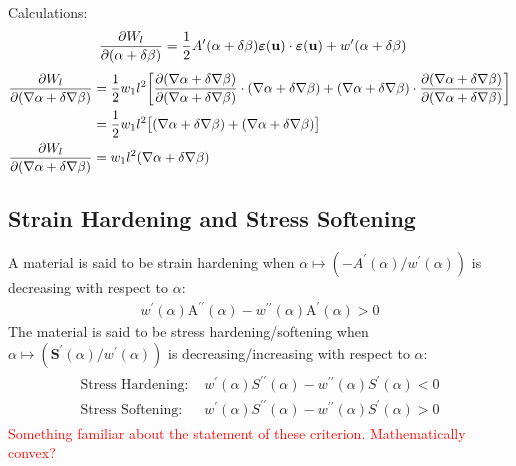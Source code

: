 \documentclass[12pt,3p]{article}
\numberwithin{equation}{section}
\begin{document}
Calculations: 
\begin{align*}
\pdv{W_l}{(\alpha + \delta \beta)} &= \frac{1}{2} A'(\alpha + \delta \beta) \boldsymbol{\varepsilon} (\mathbf{u}) \cdot \boldsymbol{\varepsilon} (\mathbf{u}) + w'(\alpha + \delta \beta)
\end{align*}
\begin{align*}
\pdv{W_l}{(\nabla \alpha + \delta \nabla \beta)} &= \frac{1}{2} w_1 l^2 \bigg[ \pdv{(\nabla \alpha + \delta \nabla \beta)}{(\nabla \alpha + \delta \nabla \beta)} \cdot (\nabla \alpha + \delta \nabla \beta) + (\nabla \alpha + \delta \nabla \beta) \cdot \pdv{(\nabla \alpha + \delta \nabla \beta)}{(\nabla \alpha + \delta \nabla \beta)} \bigg] \\
                &= \frac{1}{2} w_1 l^2 \big[(\nabla \alpha + \delta \nabla \beta) + (\nabla \alpha + \delta \nabla \beta) \big] \\
\pdv{W_l}{(\nabla \alpha + \delta \nabla \beta)} &= w_1 l^2 (\nabla \alpha + \delta \nabla \beta)
\end{align*}

\subsection{Strain Hardening and Stress Softening}
A material is said to be strain hardening when \(\alpha \mapsto\left(-A^{\prime}(\alpha) / w^{\prime}(\alpha)\right)\) is decreasing with respect to $\alpha$:
\begin{align}\label{strainHardening}
w^{\prime}(\alpha) \mathrm{A}^{\prime \prime}(\alpha)-w^{\prime \prime}(\alpha) \mathrm{A}^{\prime}(\alpha)>0
\end{align}
The material is said to be stress hardening/softening when \(\alpha \mapsto\left(\mathbf{S}^{\prime}(\alpha) / w^{\prime}(\alpha)\right)\) is decreasing/increasing with respect to $\alpha$: 
\begin{align}\label{stressHardening}
\begin{split}
\text{Stress Hardening: }& w^{\prime}(\alpha) S^{\prime \prime}(\alpha)-w^{\prime \prime}(\alpha) S^{\prime}(\alpha) < 0 \\
\text{Stress Softening: }& w^{\prime}(\alpha) S^{\prime \prime}(\alpha)-w^{\prime \prime}(\alpha) S^{\prime}(\alpha) > 0
\end{split}
\end{align}
\textcolor{red}{Something familiar about the statement of these criterion. Mathematically convex?}
\end{document}

